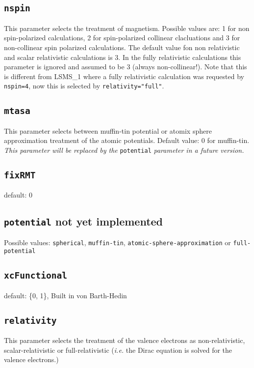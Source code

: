 \subsection{\texttt{nspin}}
This parameter selects the treatment of magnetism. Possible values are: 1 for non spin-polarized calculations,
2 for spin-polarized collinear clacluations and 3 for non-collinear spin polarized calculations.
The default value fon non relativistic and scalar relativistic
calculations is 3. In the fully relativistic
calculations this parameter is ignored and assumed to be 3 (always non-collinear!). Note that this is different from LSMS\_1
where a fully relativistic calculation was requested by \texttt{nspin=4}, now this is selected by \texttt{relativity="full"}.

\subsection{\texttt{mtasa}}
This parameter selects between muffin-tin potential or atomix sphere
approximation treatment of the atomic potentials. Default value: 0 for
muffin-tin. \textit{This parameter will be replaced by the}
\texttt{potential} \textit{parameter in a future version.}

\subsection{\texttt{fixRMT}}
default: 0

\subsection{\texttt{potential} not yet implemented}
Possible values: \texttt{spherical}, \texttt{muffin-tin},
\texttt{atomic-sphere-approximation} or \texttt{full-potential}

\subsection{\texttt{xcFunctional}}
default: \{0, 1\}, Built in von Barth-Hedin

\subsection{\texttt{relativity}}
This parameter selects the treatment of the valence electrons as non-relativistic, scalar-relativistic
or full-relativistic (\textit{i.e.} the Dirac equation is solved for the valence electrons.)

